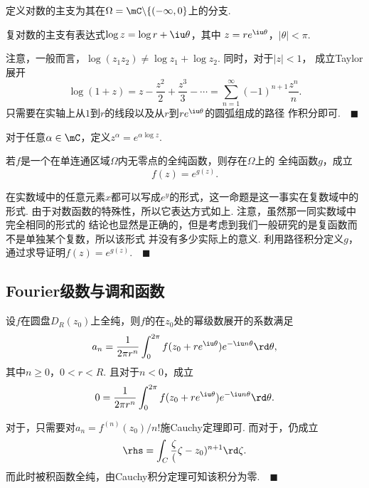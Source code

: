   \begin{defi}[主支]
    \label{defi: 复对数主支}
    定义对数的主支为其在$\Omega = \mC\backslash\{(-\infty, 0\}$上的分支.
  \end{defi}

  \begin{thm}[主支]
    复对数的主支有表达式$\log z = \log r + \iu\theta$，其中
    $z=re^{\iu\theta}$，$|\theta|<\pi$.
  \end{thm}
  \remark
    注意，一般而言，$\log(z_1z_2)\ne \log z_1 + \log z_2$. 同时，对于$|z|<1$，
    成立Taylor展开
    \[
      \log(1+z) = z-\frac{z^2}{2}+\frac{z^3}{3} - \cdots = 
      \sum_{n=1}^\infty (-1)^{n+1}\frac{z^n}{n}.
    \]
  \proof
    只需要在实轴上从$1$到$r$的线段以及从$r$到$re^{\iu\theta}$的圆弧组成的路径
    作积分即可.$\quad\blacksquare$

  \begin{defi}[指数]
    对于任意$\alpha\in\mC$，定义$z^\alpha = e^{\alpha\log z}$.
  \end{defi}

  \begin{thm}
    \label{thm: 全纯、对数存在性}
    若$f$是一个在单连通区域$\Omega$内无零点的全纯函数，则存在$\Omega$上的
    全纯函数$g$，成立
    \[
      f(z) = e^{g(z)}.
    \]
  \end{thm}
  \remark
    在实数域中的任意元素$x$都可以写成$e^y$的形式，这一命题是这一事实在复数域中的形式.
    由于对数函数的特殊性，所以它表达方式如上. 注意，虽然那一同实数域中完全相同的形式的
    结论也显然是正确的，但是考虑到我们一般研究的是复函数而不是单独某个复数，所以该形式
    并没有多少实际上的意义.
  \proof
    利用路径积分定义$g$，通过求导证明$f(z)=e^{g(z)}$.$\quad\blacksquare$


\subsection{Fourier级数与调和函数}

  \begin{thm}
    设$f$在圆盘$D_R(z_0)$上全纯，则$f$的在$z_0$处的幂级数展开的系数满足
    \begin{equation}
      \label{equ: 幂级数系数}
      a_n = \frac{1}{2\pi r^n}\int_0^{2\pi}f(z_0+re^{\iu\theta})e^{-\iu n\theta}\rd\theta,
    \end{equation}
    其中$n\ge 0$，$0<r<R$. 且对于$n<0$，成立
    \begin{equation}
      \label{equ: 幂级数系数2}
      0 = \frac{1}{2\pi r^n}\int_0^{2\pi}f(z_0+re^{\iu\theta})e^{-\iu n\theta}\rd\theta.
    \end{equation}
  \end{thm}
  \proof
    对于，只需要对$a_n = f^{(n)}(z_0)/n!$施Cauchy定理即可.
    而对于，仍成立
    \[
      \rhs = \int_C\frac{\zeta}(\zeta-z_0)^{n+1}\rd\zeta.
    \]
    而此时被积函数全纯，由Cauchy积分定理可知该积分为零.$\quad\blacksquare$

